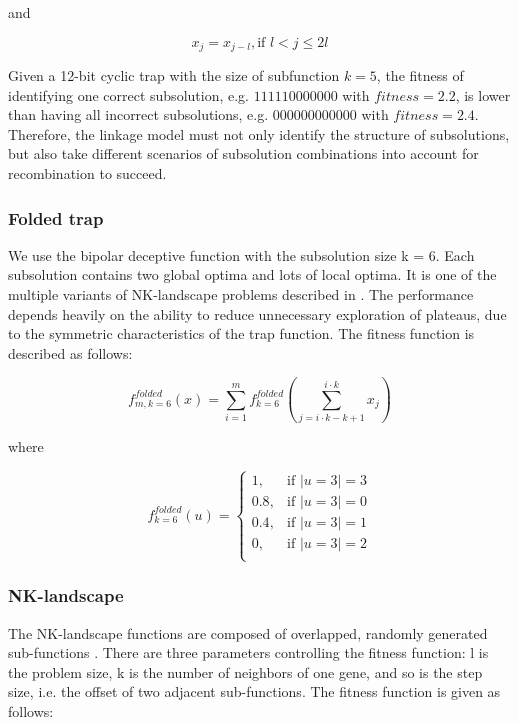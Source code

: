 \documentclass{sig-alternate-05-2015}
\begin{document}
and

\begin{displaymath}
x_j = x_{j-l}, \text{if } l < j \leq 2l
\end{displaymath}

Given a 12-bit cyclic trap with the size of subfunction $k = 5$, the fitness of identifying one correct subsolution, e.g. $111110000000$ with $fitness = 2.2$, is lower than having all incorrect subsolutions, e.g. $000000000000$ with $fitness = 2.4$. Therefore, the linkage model  must not only identify the structure of subsolutions, but also take different scenarios of subsolution combinations into account for recombination to succeed.


\subsubsection{Folded trap}
We use the bipolar deceptive function with the subsolution size k = 6. Each subsolution contains two global optima and lots of local optima. It is one of the multiple variants of NK-landscape problems described in \cite{goldberg:deception}. The performance depends heavily on the ability to reduce unnecessary exploration of plateaus, due to the symmetric characteristics of the trap function.  The fitness function is described as follows:


\begin{displaymath}
f_{m,k=6}^{folded}(x) = \sum_{i=1}^{m} f_{k=6}^{folded} \left (\sum_{j = i\cdot k-k+1}^{i\cdot k} x_j\right )
\end{displaymath}

where

\begin{displaymath}
f_{k=6}^{folded}(u) = 
   \begin{cases}
    1, 		& \text{if $|u=3| = 3$} \\
    0.8, 	& \text{if $|u=3| = 0$} \\
    0.4, 	& \text{if $|u=3| = 1$} \\
    0, 		& \text{if $|u=3| = 2$} \\
	\end{cases}
\end{displaymath}


\subsubsection{NK-landscape}
The NK-landscape functions are composed of overlapped, randomly generated sub-functions \cite{pelikan:overlap}. There are three parameters controlling the fitness function: l is the problem size, k is the number of neighbors of one gene, and so is the step size, i.e. the offset of two adjacent sub-functions. The fitness function is given as follows:
\end{document}
